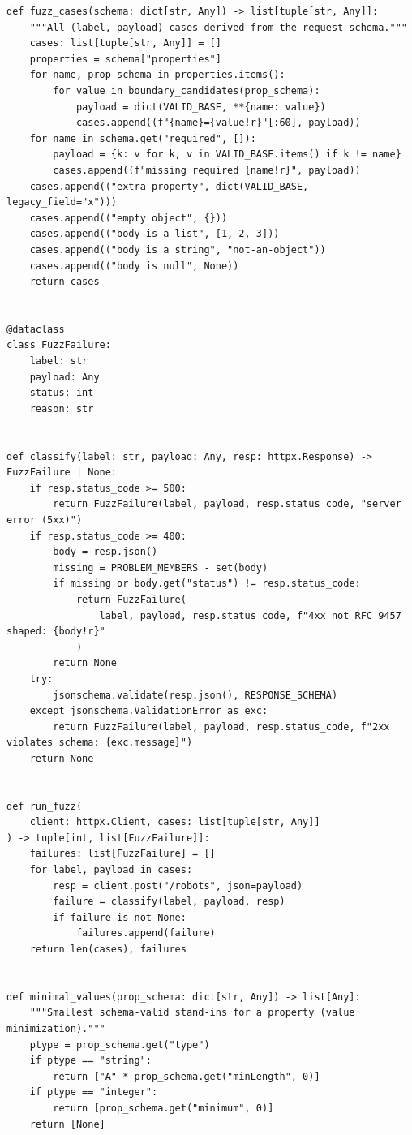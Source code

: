 \begin{verbatim}
def fuzz_cases(schema: dict[str, Any]) -> list[tuple[str, Any]]:
    """All (label, payload) cases derived from the request schema."""
    cases: list[tuple[str, Any]] = []
    properties = schema["properties"]
    for name, prop_schema in properties.items():
        for value in boundary_candidates(prop_schema):
            payload = dict(VALID_BASE, **{name: value})
            cases.append((f"{name}={value!r}"[:60], payload))
    for name in schema.get("required", []):
        payload = {k: v for k, v in VALID_BASE.items() if k != name}
        cases.append((f"missing required {name!r}", payload))
    cases.append(("extra property", dict(VALID_BASE, legacy_field="x")))
    cases.append(("empty object", {}))
    cases.append(("body is a list", [1, 2, 3]))
    cases.append(("body is a string", "not-an-object"))
    cases.append(("body is null", None))
    return cases


@dataclass
class FuzzFailure:
    label: str
    payload: Any
    status: int
    reason: str


def classify(label: str, payload: Any, resp: httpx.Response) -> FuzzFailure | None:
    if resp.status_code >= 500:
        return FuzzFailure(label, payload, resp.status_code, "server error (5xx)")
    if resp.status_code >= 400:
        body = resp.json()
        missing = PROBLEM_MEMBERS - set(body)
        if missing or body.get("status") != resp.status_code:
            return FuzzFailure(
                label, payload, resp.status_code, f"4xx not RFC 9457 shaped: {body!r}"
            )
        return None
    try:
        jsonschema.validate(resp.json(), RESPONSE_SCHEMA)
    except jsonschema.ValidationError as exc:
        return FuzzFailure(label, payload, resp.status_code, f"2xx violates schema: {exc.message}")
    return None


def run_fuzz(
    client: httpx.Client, cases: list[tuple[str, Any]]
) -> tuple[int, list[FuzzFailure]]:
    failures: list[FuzzFailure] = []
    for label, payload in cases:
        resp = client.post("/robots", json=payload)
        failure = classify(label, payload, resp)
        if failure is not None:
            failures.append(failure)
    return len(cases), failures


def minimal_values(prop_schema: dict[str, Any]) -> list[Any]:
    """Smallest schema-valid stand-ins for a property (value minimization)."""
    ptype = prop_schema.get("type")
    if ptype == "string":
        return ["A" * prop_schema.get("minLength", 0)]
    if ptype == "integer":
        return [prop_schema.get("minimum", 0)]
    return [None]



\end{verbatim}
